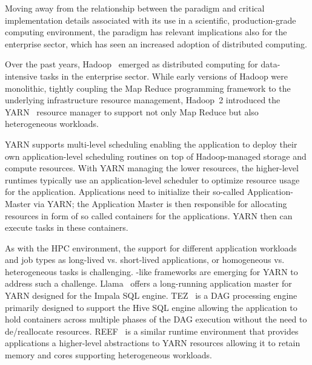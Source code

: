 \documentclass{sig-alternate}
\begin{document}

Moving away from the relationship between the \pilot paradigm and critical
implementation details associated with its use in a scientific, production-grade
computing environment, the \pilot paradigm has relevant implications also for
the enterprise sector, which has seen an increased adoption of distributed
computing.

Over the past years, Hadoop~\cite{hadoop} emerged as distributed computing for
data-intensive tasks in the enterprise sector. While early versions of Hadoop
were monolithic, tightly coupling the Map Reduce programming framework to the
underlying infrastructure resource management, Hadoop~2 introduced the
YARN~\cite{yarn-paper} resource manager to support not only Map Reduce but also
heterogeneous workloads.

YARN supports multi-level scheduling enabling the application to deploy their
own application-level scheduling routines on top of Hadoop-managed storage and
compute resources. With YARN managing the lower resources, the higher-level
runtimes typically use an application-level scheduler to optimize resource usage
for the application. Applications need to initialize their so-called
Application-Master via YARN; the Application Master is then responsible for
allocating resources in form of so called containers for the applications. YARN
then can execute tasks in these containers.

As with the HPC environment, the support for different application workloads and
job types as long-lived vs. short-lived applications, or homogeneous vs.
heterogeneous tasks is challenging. \pilot-like frameworks are emerging for YARN
to address such a challenge. Llama~\cite{llama} offers a long-running
application master for YARN designed for the Impala SQL engine. TEZ~\cite{tez}
is a DAG processing engine primarily designed to support the Hive SQL engine
allowing the application to hold containers across multiple phases of the DAG
execution without the need to de/reallocate resources.
REEF~\cite{Chun:2013:RRE:2536274.2536318} is a similar runtime environment that
provides applications a higher-level abstractions to YARN resources allowing it
to retain memory and cores supporting heterogeneous workloads.

 
\end{document}
